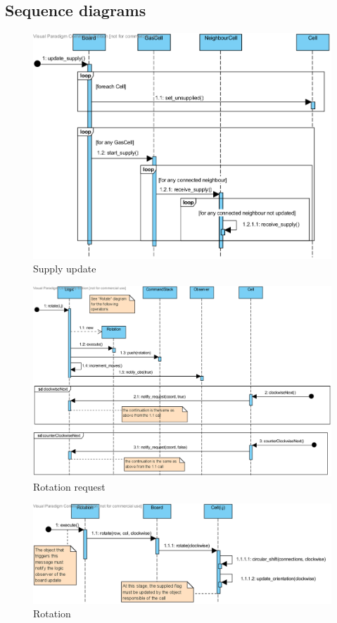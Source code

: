 \documentclass[a4paper,11pt]{article}
\begin{document}
\subsection{Sequence diagrams}
\begin{figure}
	\center
	\includegraphics[angle=90,scale=1]{supply_update.png}
	\caption{Supply update}
	\label{fig:sup_update}
\end{figure}
\begin{figure}
	\center
	\includegraphics[angle=90,scale=1]{rotation_request.png}
	\caption{Rotation request}
	\label{fig:rot_request}
\end{figure}
\begin{figure}
	\center
	\includegraphics[angle=90,scale=1]{rotation.png}
	\caption{Rotation}
	\label{fig:rotation}
\end{figure}
\end{document}
